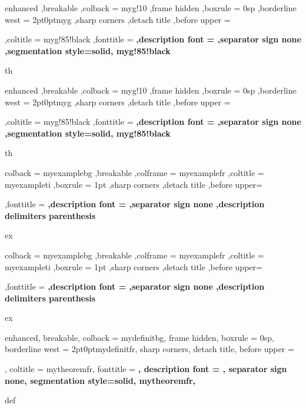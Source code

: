 
{%
	enhanced
	,breakable
	,colback = myg!10
	,frame hidden
	,boxrule = 0sp
	,borderline west = {2pt}{0pt}{myg}
	,sharp corners
	,detach title
	,before upper = \tcbtitle\par\smallskip
	,coltitle = myg!85!black
	,fonttitle = \bfseries\sffamily
	,description font = \mdseries
	,separator sign none
	,segmentation style={solid, myg!85!black}
}
{th}


{%
	enhanced
	,breakable
	,colback = myg!10
	,frame hidden
	,boxrule = 0sp
	,borderline west = {2pt}{0pt}{myg}
	,sharp corners
	,detach title
	,before upper = \tcbtitle\par\smallskip
	,coltitle = myg!85!black
	,fonttitle = \bfseries\sffamily
	,description font = \mdseries
	,separator sign none
	,segmentation style={solid, myg!85!black}
}
{th}


{%
	colback = myexamplebg
	,breakable
	,colframe = myexamplefr
	,coltitle = myexampleti
	,boxrule = 1pt
	,sharp corners
	,detach title
	,before upper=\tcbtitle\par\smallskip
	,fonttitle = \bfseries
	,description font = \mdseries
	,separator sign none
	,description delimiters parenthesis
}
{ex}

{%
	colback = myexamplebg
	,breakable
	,colframe = myexamplefr
	,coltitle = myexampleti
	,boxrule = 1pt
	,sharp corners
	,detach title
	,before upper=\tcbtitle\par\smallskip
	,fonttitle = \bfseries
	,description font = \mdseries
	,separator sign none
	,description delimiters parenthesis
}
{ex}


{%
	enhanced,
	breakable,
	colback = mydefinitbg,
	frame hidden,
	boxrule = 0sp,
	borderline west = {2pt}{0pt}{mydefinitfr},
	sharp corners,
	detach title,
	before upper = \tcbtitle\par\smallskip,
	coltitle = mytheoremfr,
	fonttitle = \bfseries\sffamily,
	description font = \mdseries,
	separator sign none,
	segmentation style={solid, mytheoremfr},
}
{def}

